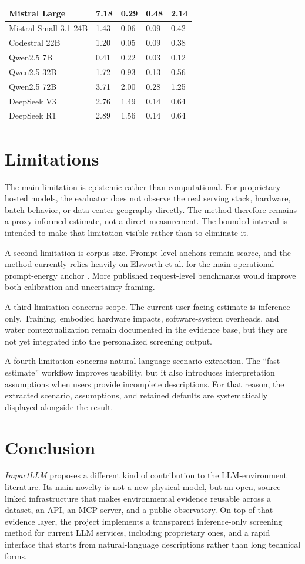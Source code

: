 \documentclass[10pt,a4paper]{article}
\begin{document}
\begin{longtable}{|L{4.0cm}|L{2.0cm}|L{2.2cm}|L{1.7cm}|L{1.8cm}|}
\hline
Mistral Large & 7.18 & 0.29 & 0.48 & 2.14 \\
\hline
Mistral Small 3.1 24B & 1.43 & 0.06 & 0.09 & 0.42 \\
\hline
Codestral 22B & 1.20 & 0.05 & 0.09 & 0.38 \\
\hline
Qwen2.5 7B & 0.41 & 0.22 & 0.03 & 0.12 \\
\hline
Qwen2.5 32B & 1.72 & 0.93 & 0.13 & 0.56 \\
\hline
Qwen2.5 72B & 3.71 & 2.00 & 0.28 & 1.25 \\
\hline
DeepSeek V3 & 2.76 & 1.49 & 0.14 & 0.64 \\
\hline
DeepSeek R1 & 2.89 & 1.56 & 0.14 & 0.64 \\
\hline
\end{longtable}

\section{Limitations}
The main limitation is epistemic rather than computational. For proprietary hosted models, the evaluator does not observe the real serving stack, hardware, batch behavior, or data-center geography directly. The method therefore remains a proxy-informed estimate, not a direct measurement. The bounded interval is intended to make that limitation visible rather than to eliminate it.

A second limitation is corpus size. Prompt-level anchors remain scarce, and the method currently relies heavily on Elsworth et al. for the main operational prompt-energy anchor \cite{elsworth2025}. More published request-level benchmarks would improve both calibration and uncertainty framing.

A third limitation concerns scope. The current user-facing estimate is inference-only. Training, embodied hardware impacts, software-system overheads, and water contextualization remain documented in the evidence base, but they are not yet integrated into the personalized screening output.

A fourth limitation concerns natural-language scenario extraction. The ``fast estimate'' workflow improves usability, but it also introduces interpretation assumptions when users provide incomplete descriptions. For that reason, the extracted scenario, assumptions, and retained defaults are systematically displayed alongside the result.

\section{Conclusion}
\emph{ImpactLLM} proposes a different kind of contribution to the LLM-environment literature. Its main novelty is not a new physical model, but an open, source-linked infrastructure that makes environmental evidence reusable across a dataset, an API, an MCP server, and a public observatory. On top of that evidence layer, the project implements a transparent inference-only screening method for current LLM services, including proprietary ones, and a rapid interface that starts from natural-language descriptions rather than long technical forms.
\end{document}
